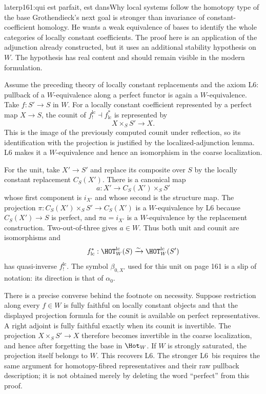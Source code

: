 \begin{dcomment}{later}{p161:qui est parfait, est dans}{Why local systems follow the homotopy type of the base}
Grothendieck's next goal is stronger than invariance of constant-coefficient homology. He wants a weak equivalence of bases to identify the whole categories of locally constant coefficients. The proof here is an application of the adjunction already constructed, but it uses an additional stability hypothesis on $W$. The hypothesis has real content and should remain visible in the modern formulation.

Assume the preceding theory of locally constant replacements and the axiom L6: pullback of a $W$-equivalence along a perfect functor is again a $W$-equivalence. Take $f:S'\to S$ in $W$. For a locally constant coefficient represented by a perfect map $X\to S$, the counit of $f_!^{\mathrm{lc}}\dashv f^*_{\mathrm{lc}}$ is represented by
\[
 X\times_SS'\longrightarrow X.
\]
This is the image of the previously computed counit under reflection, so its identification with the projection is justified by the localized-adjunction lemma. L6 makes it a $W$-equivalence and hence an isomorphism in the coarse localization.

For the unit, take $X'\to S'$ and replace its composite over $S$ by the locally constant replacement $C_S(X')$. There is a canonical map
\[
 a:X'\longrightarrow C_S(X')\times_SS'
\]
whose first component is $i_{X'}$ and whose second is the structure map. The projection $\pi:C_S(X')\times_SS'\to C_S(X')$ is a $W$-equivalence by L6 because $C_S(X')\to S$ is perfect, and $\pi a=i_{X'}$ is a $W$-equivalence by the replacement construction. Two-out-of-three gives $a\in W$. Thus both unit and counit are isomorphisms and
\[
 f^*_{\mathrm{lc}}:\HOT_W^{\mathrm{lc}}(S)
 \xrightarrow{\sim}\HOT_W^{\mathrm{lc}}(S')
\]
has quasi-inverse $f_!^{\mathrm{lc}}$. The symbol $\beta_{0,X'}$ used for this unit on page 161 is a slip of notation: its direction is that of $\alpha_0$.

There is a precise converse behind the footnote on necessity. Suppose restriction along every $f\in W$ is fully faithful on locally constant objects and that the displayed projection formula for the counit is available on perfect representatives. A right adjoint is fully faithful exactly when its counit is invertible. The projection $X\times_SS'\to X$ therefore becomes invertible in the coarse localization, and hence after forgetting the base in $\Hot_W$. If $W$ is strongly saturated, the projection itself belongs to $W$. This recovers L6. The stronger L6~bis requires the same argument for homotopy-fibred representatives and their raw pullback description; it is not obtained merely by deleting the word ``perfect'' from this proof.


\end{dcomment}
